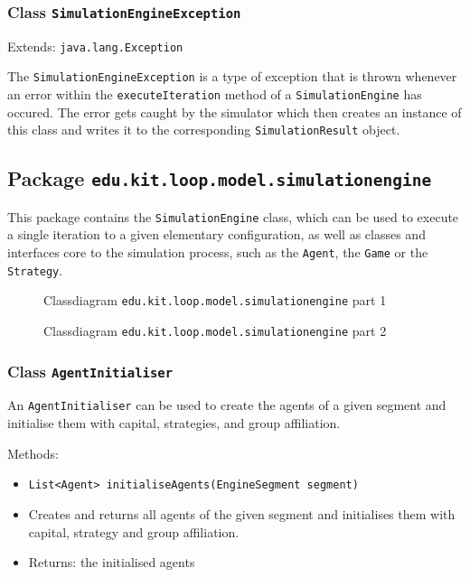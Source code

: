 \documentclass[parskip=full,11pt]{scrartcl}
\begin{document}
\subsubsection{Class \texttt{SimulationEngineException}}
Extends: \texttt{java.lang.Exception}

The \texttt{SimulationEngineException} is a type of exception that is thrown whenever an error within the \texttt{executeIteration} method of a \texttt{SimulationEngine} has occured. The error gets caught by the simulator which then creates an instance of this class and writes it to the corresponding \texttt{SimulationResult} object.

\subsection{Package \texttt{edu.kit.loop.model.simulationengine}}


This package contains the \texttt{SimulationEngine} class, which can be used to execute a single iteration to a given elementary configuration, as well as classes and interfaces core to the simulation process, such as the \texttt{Agent}, the \texttt{Game} or the \texttt{Strategy}.
\iftrue
\begin{figure}[h]
	\centering
	\fontsize{4}{8}\selectfont
	

	\caption{Classdiagram \texttt{edu.kit.loop.model.simulationengine} part 1}
\end{figure}

\begin{figure}[h]
	\centering
	\fontsize{3}{8}\selectfont
	

	\caption{Classdiagram \texttt{edu.kit.loop.model.simulationengine} part 2}
\end{figure}
\fi


\subsubsection{Class \texttt{AgentInitialiser}}
An \texttt{AgentInitialiser} can be used to create the agents of a given segment and initialise them with capital, strategies, and group affiliation.

Methods:
\begin{itemize}\itemsep -10pt
\item \texttt{List<Agent> initialiseAgents(EngineSegment segment)}
\item[] Creates and returns all agents of the given segment and initialises them with capital, strategy and group affiliation.
\item[] Returns: the initialised agents
\end{itemize}
\end{document}
